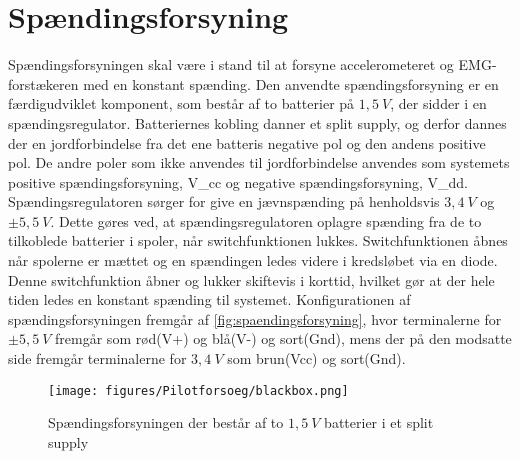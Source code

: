 \section{Spændingsforsyning}
Spændingsforsyningen skal være i stand til at forsyne accelerometeret og EMG-forstækeren med en konstant spænding. Den anvendte spændingsforsyning er en færdigudviklet komponent, som består af to batterier på $1,5~V$, der sidder i en spændingsregulator. Batteriernes kobling danner et split supply, og derfor dannes der en jordforbindelse fra det ene batteris negative pol og den andens positive pol. De andre poler som ikke anvendes til jordforbindelse anvendes som systemets positive spændingsforsyning, {V}_{cc} og negative spændingsforsyning, {V}_{dd}.
Spændingsregulatoren sørger for give en jævnspænding på henholdsvis $3,4~V$ og $\pm 5,5~V$. Dette gøres ved, at spændingsregulatoren oplagre spænding fra de to tilkoblede batterier i spoler, når switchfunktionen lukkes. Switchfunktionen åbnes når spolerne er mættet og en spændingen ledes videre i kredsløbet via en diode. Denne switchfunktion åbner og lukker skiftevis i korttid, hvilket gør at der hele tiden ledes en konstant spænding til systemet. 
Konfigurationen af spændingsforsyningen fremgår af \autoref{fig:spaendingsforsyning}, hvor terminalerne for $\pm 5,5~V$ fremgår som rød(V+) og blå(V-) og sort(Gnd), mens der på den modsatte side fremgår terminalerne for $3,4~V$ som brun(Vcc) og sort(Gnd). 


\begin{figure}[H]
\centering
\texttt{[image: figures/Pilotforsoeg/blackbox.png]}
\caption{Spændingsforsyningen der består af to $1,5~V$ batterier i et split supply}
\label{fig:spaendingsforsyning}
\end{figure}
